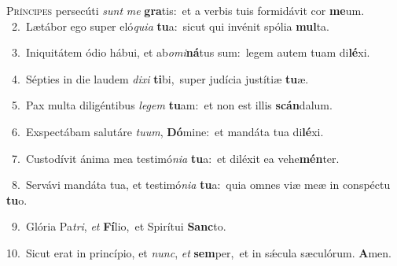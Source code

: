 \lettrine{\initial\textcolor{\initialcolor}{P}}{ríncipes} persecúti \textit{sunt} \textit{me} \textbf{gra}\-tis:~\star et a verbis tuis formidávit cor \textbf{me}\-um.\\
{\numbfont\textcolor{\numbcolor}{~2.}}~Lætábor ego super eló\-\textit{qui}\-\textit{a} \textbf{tu}\-a:~\star sicut qui invénit spólia \textbf{mul}\-ta.\par
{\numbfont\textcolor{\numbcolor}{~3.}}~Iniquitátem ódio hábui, et ab\-\textit{o}\-\textit{mi}\textbf{ná}tus sum:~\star legem autem tuam di\-\textbf{lé}\-xi.\par
{\numbfont\textcolor{\numbcolor}{~4.}}~Sépties in die laudem \textit{di}\-\textit{xi} \textbf{ti}\-bi,~\star super judícia justítiæ \textbf{tu}\-æ.\par
{\numbfont\textcolor{\numbcolor}{~5.}}~Pax multa diligéntibus \textit{le}\-\textit{gem} \textbf{tu}\-am:~\star et non est illis \textbf{scán}\-dalum.\par
{\numbfont\textcolor{\numbcolor}{~6.}}~Exspectábam salutáre \textit{tu}\-\textit{um}, \textbf{Dó}\-mine:~\star et mandáta tua di\-\textbf{lé}\-xi.\par
{\numbfont\textcolor{\numbcolor}{~7.}}~Custodívit ánima mea testimó\-\textit{ni}\-\textit{a} \textbf{tu}\-a:~\star et diléxit ea vehe\-\textbf{mén}\-ter.\par
{\numbfont\textcolor{\numbcolor}{~8.}}~Servávi mandáta tua, et testimó\-\textit{ni}\-\textit{a} \textbf{tu}\-a:~\star quia omnes viæ meæ in conspéctu \textbf{tu}\-o.\par
{\numbfont\textcolor{\numbcolor}{~9.}}~Glória Pa\-\textit{tri}\-, \textit{et} \textbf{Fí}\-lio,~\star et Spirítui \textbf{Sanc}\-to.\par
{\numbfont\textcolor{\numbcolor}{10.}}~Sicut erat in princípio, et \textit{nunc}\-, \textit{et} \textbf{sem}\-per,~\star et in sǽcula sæculórum. \textbf{A}\-men.\par
